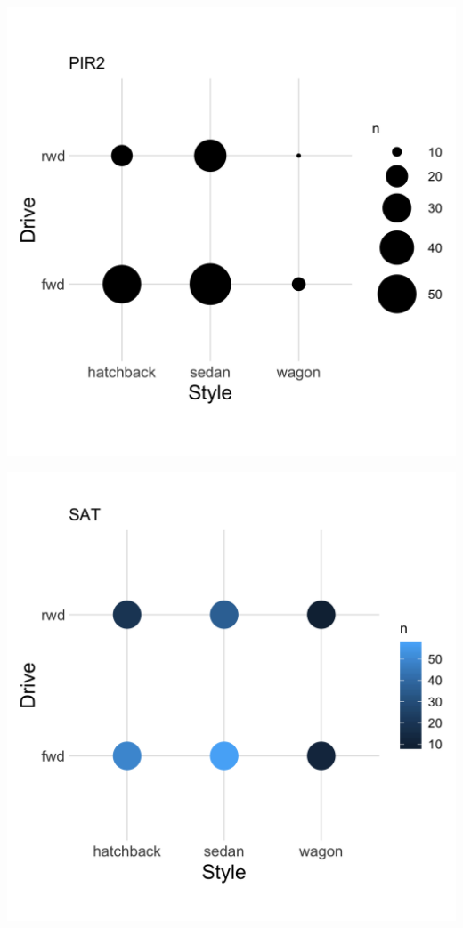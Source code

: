 \documentclass[]{article}
\newcommand{\setwidth}{0.40\textwidth}
\begin{document}
\noindent\hrulefill

\hspace*{\fill}
\begin{minipage}{\setwidth}
  \centering
  \includegraphics[width=1.00\textwidth]{../images/05_area}
\end{minipage} %
\hfill\vline\hfill
\begin{minipage}{\setwidth}
  \centering
  \includegraphics[width=1.00\textwidth]{../images/06_sat}
\end{minipage}
\hspace*{\fill}
%
\end{document}
